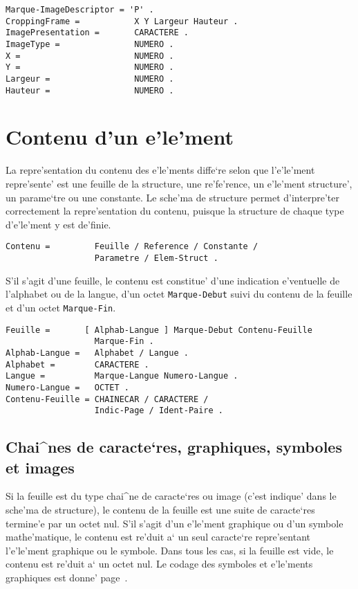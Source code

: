 \begin{verbatim}
Marque-ImageDescriptor = 'P' .
CroppingFrame =           X Y Largeur Hauteur .
ImagePresentation =       CARACTERE .
ImageType =               NUMERO .
X =                       NUMERO .
Y =                       NUMERO .
Largeur =                 NUMERO .
Hauteur =                 NUMERO .
\end{verbatim}

\section{Contenu d'un e'le'ment}
\label{contenu}

La repre'sentation du contenu des e'le'ments diffe`re selon que l'e'le'ment
repre'sente' est une feuille de la structure, une re'fe'rence, un e'le'ment
structure', un parame`tre ou une constante. Le sche'ma de structure permet
d'interpre'ter correctement la repre'sentation du contenu, puisque la
structure de chaque type d'e'le'ment y est de'finie.

\begin{verbatim}
Contenu =         Feuille / Reference / Constante /
                  Parametre / Elem-Struct .
\end{verbatim}

S'il s'agit d'une feuille, le contenu est constitue' d'une
indication e'ventuelle de l'alphabet ou de la langue, d'un octet
{\tt Marque-Debut} suivi du contenu de la feuille et d'un octet
{\tt Marque-Fin}.

\begin{verbatim}
Feuille =       [ Alphab-Langue ] Marque-Debut Contenu-Feuille
                  Marque-Fin .
Alphab-Langue =   Alphabet / Langue .
Alphabet =        CARACTERE .
Langue =          Marque-Langue Numero-Langue .
Numero-Langue =   OCTET .
Contenu-Feuille = CHAINECAR / CARACTERE /
                  Indic-Page / Ident-Paire .
\end{verbatim}

\subsection{Chai^nes de caracte`res, graphiques, symboles et images}

Si la feuille est du type chai^ne de caracte`res ou image (c'est indique'
dans le sche'ma de structure), le contenu de la feuille est une suite de
caracte`res termine'e par un octet nul. S'il s'agit d'un e'le'ment graphique
ou d'un symbole mathe'matique, le contenu est re'duit a` un seul caracte`re
repre'sentant l'e'le'ment graphique ou le symbole. Dans tous les cas, si la
feuille est vide, le contenu est re'duit a` un octet nul. Le codage des
symboles et e'le'ments graphiques est donne' page~\pageref{pagegraph}.

